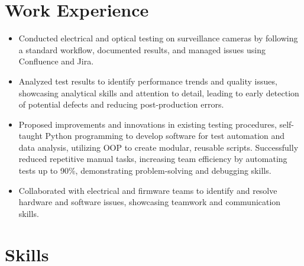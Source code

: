 \documentclass[11pt,a4paper,sans]{moderncv}
\begin{document}
\vspace{-0.2cm} 

\section{Work Experience}
{
    \begin{itemize}
    \item Conducted electrical and optical testing on surveillance cameras by following a standard workflow, documented results, and managed issues using Confluence and Jira.
    \item Analyzed test results to identify performance trends and quality issues, showcasing analytical skills and attention to detail, leading to early detection of potential defects and reducing post-production errors.
    \item Proposed improvements and innovations in existing testing procedures, self-taught Python programming to develop software for test automation and data analysis, utilizing OOP to create modular, reusable scripts. Successfully reduced repetitive manual tasks, increasing team efficiency by automating tests up to 90\%, demonstrating problem-solving and debugging skills.
    \item Collaborated with electrical and firmware teams to identify and resolve hardware and software issues, showcasing teamwork and communication skills.
    \end{itemize}
}

\vspace{-0.2cm} 

\section{Skills}
\end{document}
